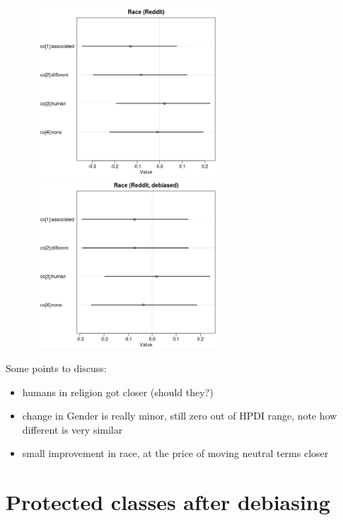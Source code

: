 \documentclass[
  12pt,
]{book}
\begin{document}
\begin{center}
\begin{figure}[!htb]
   
  \begin{minipage}{0.55\textwidth}
\includegraphics[width=7cm]{../images/raceCoeffs.jpeg}
\end{minipage}
   \begin {minipage}{0.43\textwidth}
    \includegraphics[width=7cm]{../images/debiasedRaceRedditCoeffs.jpeg}
   \end{minipage}
\end{figure}

\end{center}


Some points to discuss:

\begin{itemize}
\item
  humans in religion got closer (should they?)
\item
  change in Gender is really minor, still zero out of HPDI range, note how different is very similar
\item
  small improvement in race, at the price of moving neutral terms closer
\end{itemize}

\hypertarget{protected-classes-after-debiasing}{%
\section{Protected classes after debiasing}\label{protected-classes-after-debiasing}}
\end{document}
